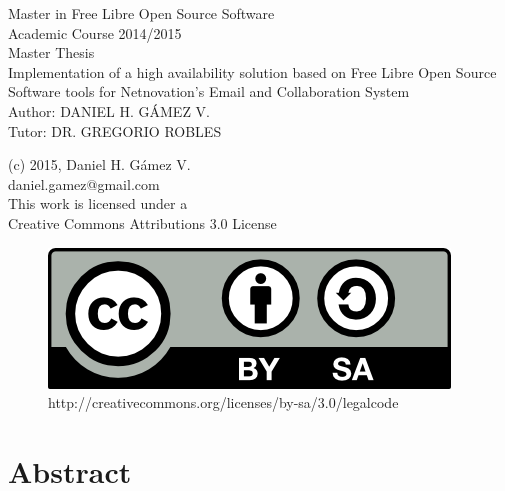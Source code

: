 \documentclass[a4paper, 12pt]{book}
\begin{document}
\begin{titlepage}
\begin{center}
  \Large
  Master in Free Libre Open Source Software\\
  \vspace{0.2cm}
  \large
  Academic Course 2014/2015 \\
  \vspace{0.4cm}
  Master Thesis \\
  \vspace{1cm}
  \LARGE
  Implementation of a high availability solution based on Free Libre Open Source Software tools for Netnovation's Email and Collaboration System \\
  \vspace{2cm}
  \large
  Author: DANIEL H. G\'{A}MEZ V.\\
  Tutor: DR. GREGORIO ROBLES
  
  \end{center}
\end{titlepage}

%
{\raggedleft
(c) 2015, Daniel H. G\'{a}mez V.\\
 daniel.gamez@gmail.com\\
 This work is licensed under a\\
 Creative Commons Attributions 3.0 License
  \begin{figure}[H]
    {\raggedleft
    \includegraphics[scale=0.80]{by-sa.png}\\
    \hfill http://creativecommons.org/licenses/by-sa/3.0/legalcode
    }
  \label{fig:logo}
  \end{figure}
}

%
\chapter*{Abstract}
\label{chap:abstract}
\end{document}
